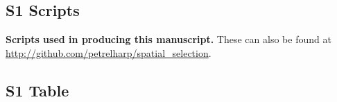 \documentclass[10pt,letterpaper]{article}
\DeclareMathOperator{\sn}{sn}
\begin{document}
% 
% 

% 


\subsection*{S1 Scripts}

\textbf{Scripts used in producing this manuscript.}
These can also be found at \url{http://github.com/petrelharp/spatial_selection}.

\subsection*{S1 Table}
 \label{stab:mutation_params}
\end{document}
